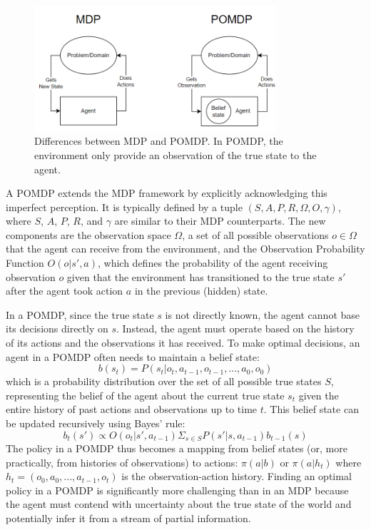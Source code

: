 \begin{figure}
  \centering
  \includegraphics[width=0.8\textwidth]{images/MDP_POMDP_comparison.png}
  \caption{Differences between MDP and POMDP. In POMDP, the environment only provide an observation of the true state to the agent.}
  \label{fig:MDP_POMDP}
\end{figure}

A \gls{POMDP} extends the \gls{MDP} framework by explicitly acknowledging this imperfect perception. It is typically defined by a tuple \((S, A, P, R, \Omega, O, \gamma)\), where \(S\), \(A\), \(P\), \(R\), and \(\gamma\) are similar to their \gls{MDP} counterparts. The new components are the observation space \(\Omega\), a set of all possible observations \(o \in \Omega\) that the agent can receive from the environment, and the Observation Probability Function \(O(o | s', a)\), which defines the probability of the agent receiving observation \(o\) given that the environment has transitioned to the true state \(s'\) after the agent took action \(a\) in the previous (hidden) state.

In a \gls{POMDP}, since the true state \(s\) is not directly known, the agent cannot base its decisions directly on \(s\). Instead, the agent must operate based on the history of its actions and the observations it has received. To make optimal decisions, an agent in a POMDP often needs to maintain a belief state:
\[b(s_t) = P(s_t | o_t, a_{t-1}, o_{t-1}, ..., a_0, o_0)\]
which is a probability distribution over the set of all possible true states \(S\), representing the belief of the agent about the current true state \(s_t\) given the entire history of past actions and observations up to time \(t\). This belief state can be updated recursively using Bayes' rule:
\[b_t(s') \propto  O(o_t | s', a_{t-1}) \Sigma_{s \in S} P(s' | s, a_{t-1}) b_{t-1}(s)\]
The policy in a \gls{POMDP} thus becomes a mapping from belief states (or, more practically, from histories of observations) to actions: \(\pi(a | b)\) or \(\pi(a | h_t)\) where \(h_t = (o_0, a_0, ..., a_{t-1}, o_t)\) is the observation-action history. Finding an optimal policy in a \gls{POMDP} is significantly more challenging than in an \gls{MDP} because the agent must contend with uncertainty about the true state of the world and potentially infer it from a stream of partial information.

